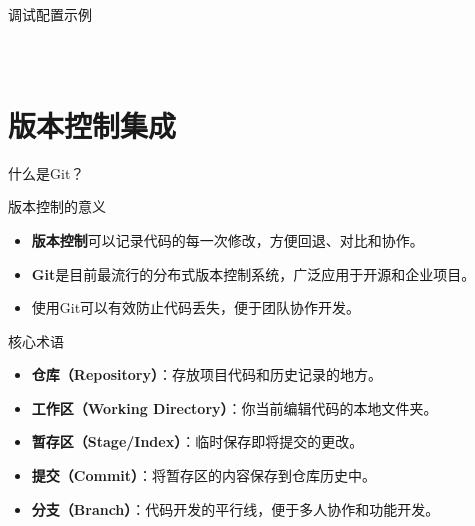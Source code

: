 \documentclass[UTF8,aspectratio=169]{beamer}
\begin{document}
\begin{frame}[fragile]{调试配置示例}
        \begin{columns}
            \begin{column}{0.48\textwidth}
                \inputminted[firstline=1,lastline=15]{cpp}{code/main.cpp}
            \end{column}
            \begin{column}{0.48\textwidth}
                \inputminted[firstline=16]{cpp}{code/main.cpp}
            \end{column}
        \end{columns}
\end{frame}

\section{版本控制集成}

\begin{frame}{什么是Git？}
    \begin{ytublock}{版本控制的意义}
        \begin{itemize}
            \item \textbf{版本控制}可以记录代码的每一次修改，方便回退、对比和协作。
            \item \textbf{Git}是目前最流行的分布式版本控制系统，广泛应用于开源和企业项目。
            \item 使用Git可以有效防止代码丢失，便于团队协作开发。
        \end{itemize}
    \end{ytublock}
    \begin{ytublock}{核心术语}
        \begin{itemize}
            \item \textbf{仓库（Repository）}：存放项目代码和历史记录的地方。
            \item \textbf{工作区（Working Directory）}：你当前编辑代码的本地文件夹。
            \item \textbf{暂存区（Stage/Index）}：临时保存即将提交的更改。
            \item \textbf{提交（Commit）}：将暂存区的内容保存到仓库历史中。
            \item \textbf{分支（Branch）}：代码开发的平行线，便于多人协作和功能开发。
        \end{itemize}
    \end{ytublock}
\end{frame}
\end{document}
